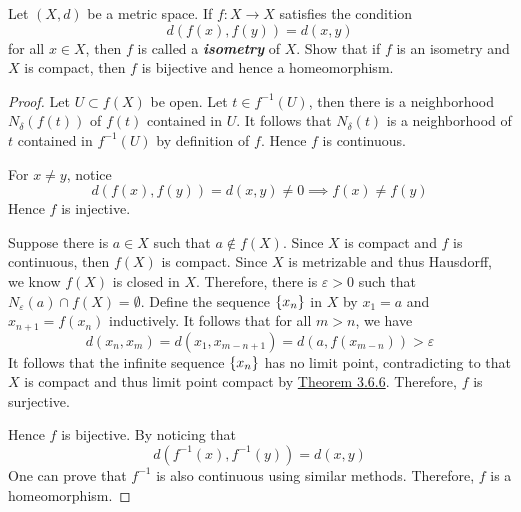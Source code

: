 \documentclass[12pt,a4paper]{article}
\begin{document}
    \begin{ex}
        Let $(X,d)$ be a metric space. If $f:X\to X$ satisfies the condition
        $$
        d(f(x),f(y))=d(x,y)
        $$
        for all $x\in X$, then $f$ is called a \textbf{\textit{isometry}} of $X$. Show that if $f$ is an isometry and $X$ is compact, then $f$ is bijective and hence a homeomorphism.
    \end{ex}
    \begin{proof}
        Let $U\subset f(X)$ be open. Let $t\in f^{-1}(U)$, then there is a neighborhood $N_\delta(f(t))$ of $f(t)$ contained in $U$. It follows that $N_\delta(t)$ is a neighborhood of $t$ contained in $f^{-1}(U)$ by definition of $f$. Hence $f$ is continuous.
        
        For $x\neq y$, notice 
        $$
        d(f(x),f(y))=d(x,y)\neq 0\implies f(x)\neq f(y)
        $$
        Hence $f$ is injective.

        Suppose there is $a\in X$ such that $a\notin f(X)$. Since $X$ is compact and $f$ is continuous, then $f(X)$ is compact. Since $X$ is metrizable and thus Hausdorff, we know $f(X)$ is closed in $X$. Therefore, there is $\varepsilon>0$ such that $N_\varepsilon(a)\cap f(X)=\emptyset$. Define the sequence $\left\{x_n\right\}$ in $X$ by $x_1=a$ and $x_{n+1}=f(x_n)$ inductively. It follows that for all $m>n$, we have
        $$
        d(x_n,x_m)=d(x_1,x_{m-n+1})=d(a,f(x_{m-n}))>\varepsilon
        $$
        It follows that the infinite sequence $\left\{x_n\right\}$ has no limit point, contradicting to that $X$ is compact and thus limit point compact by \hyperref[3.6.6]{Theorem 3.6.6}. Therefore, $f$ is surjective.

        Hence $f$ is bijective. By noticing that 
        $$
        d(f^{-1}(x),f^{-1}(y))=d(x,y)
        $$
        One can prove that $f^{-1}$ is also continuous using similar methods. Therefore, $f$ is a homeomorphism. 
    \end{proof}
    \hfill
\end{document}
